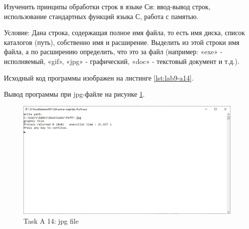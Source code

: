 \documentclass[12pt,a4paper]{article}
\begin{document}
\maketitle



\labheading



\begin{labgoal}
Изученить принципы обработки строк в языке Си: ввод-вывод строк, использование стандартных функций языка С, работа с памятью.
\end{labgoal}



\labreport

\begin{conductionA14}
Условие: Дана строка, содержащая полное имя файла, то есть имя диска, список
каталогов (путь), собственно имя и расширение. Выделить из этой строки имя
файла, а по расширению определить, что это за файл (например: «exe» -
исполняемый, «gif», «jpg» - графический, «doc» - текстовый документ и т.д.).
\end{conductionA14}



Исходный код программы изображен на листинге \ref{lst:lab9-a14}.







Вывод программы при jpg-файле на рисунке \ref{fig:a14-jpg}.

\begin{figure}[ht]
  \centering
  \includegraphics[width=12cm]{imgs/a14jpg.png}
  \caption{Task A 14: jpg file}
  \label{fig:a14-jpg}
\end{figure}
\end{document}
